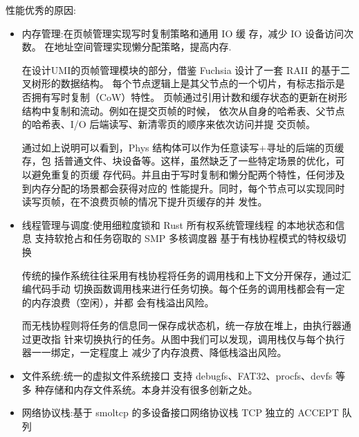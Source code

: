 性能优秀的原因:
\begin{itemize}
    \item 内存管理:在页帧管理实现写时复制策略和通用 IO 缓
存，减少 IO 设备访问次数。
在地址空间管理实现懒分配策略，提高内存.

在设计UMI的页帧管理模块的部分，借鉴 Fuchsia 设计了一套 RAII 的基于二叉树形的数据结构。
每个节点逻辑上是其父节点的一个切片，有标志指示是否拥有写时复制（CoW）特性。
页帧通过引用计数和缓存状态的更新在树形结构中复制和流动。例如在提交页帧的时候，
依次从自身的哈希表、父节点的哈希表、I/O 后端读写、新清零页的顺序来依次访问并提
交页帧。

通过如上说明可以看到，Phys 结构体可以作为任意读写+寻址的后端的页缓存，包
括普通文件、块设备等。这样，虽然缺乏了一些特定场景的优化，可以避免重复的页缓
存代码。并且由于写时复制和懒分配两个特性，任何涉及到内存分配的场景都会获得对应的
性能提升。同时，每个节点可以实现同时读写页帧，在不浪费页帧的情况下提升页缓存的并
发性。
    \item 线程管理与调度:使用细粒度锁和 Rust 所有权系统管理线程
的本地状态和信息
支持软抢占和任务窃取的 SMP 多核调度器
基于有栈协程模式的特权级切换

传统的操作系统往往采用有栈协程将任务的调用栈和上下文分开保存，通过汇编代码手动
切换函数调用栈来进行任务切换。每个任务的调用栈都会有一定的内存浪费（空闲），并都
会有栈溢出风险。

而无栈协程则将任务的信息同一保存成状态机，统一存放在堆上，由执行器通过更改指
针来切换执行的任务。从图中我们可以发现，调用栈仅与每个执行器一一绑定，一定程度上
减少了内存浪费、降低栈溢出风险。

    \item 文件系统:统一的虚拟文件系统接口
支持 debugfs、FAT32、procfs、devfs 等多
种存储和内存文件系统。本身并没有很多创新之处。
    \item 网络协议栈:基于 smoltcp 的多设备接口网络协议栈
TCP 独立的 ACCEPT 队列
\end{itemize}

